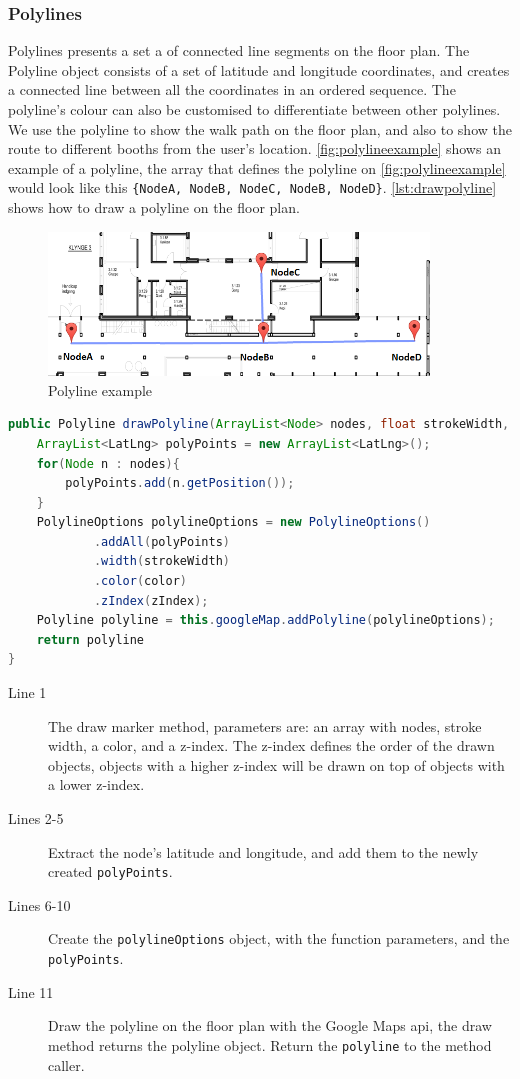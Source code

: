\subsubsection*{Polylines}
Polylines presents a set a of connected line segments on the floor plan. The Polyline object consists of a set of latitude and longitude coordinates, and creates a connected line between all the coordinates in an ordered sequence. The polyline's colour can also be customised to differentiate between other polylines. We use the polyline to show the walk path on the floor plan, and also to show the route to different booths from the user's location. \autoref{fig:polylineexample} shows an example of a polyline, the array that defines the polyline on \autoref{fig:polylineexample} would look like this \lstinline|{NodeA, NodeB, NodeC, NodeB, NodeD}|. \autoref{lst:drawpolyline} shows how to draw a polyline on the floor plan.
\begin{figure}[H]
\centering
\includegraphics[width=0.9\textwidth]{img/polylineExample.png}
\caption{Polyline example}
\label{fig:polylineexample}
\end{figure}
\begin{lstlisting}[language=java, label=lst:drawpolyline, caption=Method for drawing a polyline.]
public Polyline drawPolyline(ArrayList<Node> nodes, float strokeWidth, int color, int zIndex){
    ArrayList<LatLng> polyPoints = new ArrayList<LatLng>();
    for(Node n : nodes){
        polyPoints.add(n.getPosition());
    }
    PolylineOptions polylineOptions = new PolylineOptions()
            .addAll(polyPoints)
            .width(strokeWidth)
            .color(color)
            .zIndex(zIndex);
    Polyline polyline = this.googleMap.addPolyline(polylineOptions);
    return polyline
}
\end{lstlisting}
\begin{description}
\item[Line 1] The draw marker method, parameters are: an array with nodes, stroke width, a color, and a z-index. The z-index defines the order of the drawn objects,  objects with a higher z-index will be drawn on top of objects with a lower z-index. 
\item[Lines 2-5] Extract the node's latitude and longitude, and add them to the newly created \lstinline|polyPoints|.
\item[Lines 6-10] Create the \lstinline|polylineOptions| object, with the function parameters, and the \lstinline|polyPoints|.
\item[Line 11] Draw the polyline on the floor plan with the Google Maps \ac{api}, the draw method returns the polyline object. Return the \lstinline|polyline| to the method caller.
\end{description}

